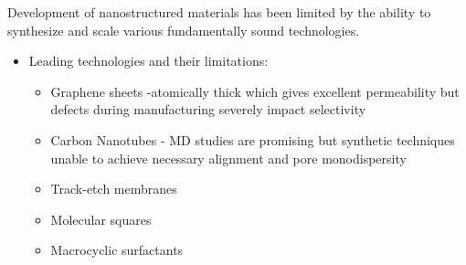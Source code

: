 \documentclass{article}
\begin{document}
	Development of nanostructured materials has been limited by the ability to synthesize and scale various fundamentally sound technologies.
	\begin{itemize}
		\item Leading technologies and their limitations:
		\begin{itemize}
			\item Graphene sheets -atomically thick which gives excellent permeability but defects during manufacturing severely impact selectivity
			\item Carbon Nanotubes - MD studies are promising but synthetic techniques unable to achieve necessary alignment and pore monodispersity
			\item Track-etch membranes
		    	\item Molecular squares
			\item Macrocyclic surfactants 
		\end{itemize}
	\end{itemize}
	  
\end{document}
